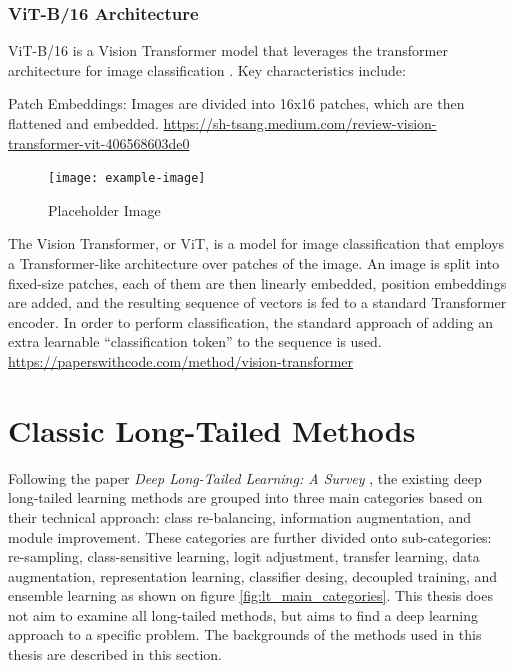 
\subsubsection{ViT-B/16 Architecture}
\label{sec:vitb16}
ViT-B/16 is a Vision Transformer model that leverages the transformer architecture for image classification \cite{dosovitskiy2021imageworth16x16words}. Key characteristics include:

Patch Embeddings: Images are divided into 16x16 patches, which are then flattened and embedded.
\url{https://sh-tsang.medium.com/review-vision-transformer-vit-406568603de0}

\begin{figure}[ht]
    \centering
    \texttt{[image: example-image]} 
    \caption{Placeholder Image }
    \label{fig:placeholder4}
\end{figure}

The Vision Transformer, or ViT, is a model for image classification that employs a Transformer-like architecture over patches of the image. An image is split into fixed-size patches, each of them are then linearly embedded, position embeddings are added, and the resulting sequence of vectors is fed to a standard Transformer encoder. In order to perform classification, the standard approach of adding an extra learnable “classification token” to the sequence is used.
\url{https://paperswithcode.com/method/vision-transformer}


\section{Classic Long-Tailed Methods}
\label{sec:lt_methods}

Following the paper \textit{Deep Long-Tailed Learning: A Survey} \cite{zhang2023deep}, the existing deep long-tailed learning methods are grouped into three main categories based on their technical approach: class re-balancing, information augmentation, and module improvement. These categories are further divided onto sub-categories: re-sampling, class-sensitive learning, logit adjustment, transfer learning, data augmentation, representation learning, classifier desing, decoupled training, and ensemble learning as shown on figure \ref{fig:lt_main_categories}. This thesis does not aim to examine all long-tailed methods, but aims to find a deep learning approach to a specific problem. The backgrounds of the methods used in this thesis are described in this section.

